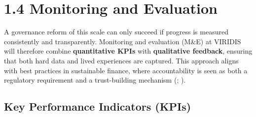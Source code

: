\documentclass[
  english,
  12pt,
  oneside,
  open=any]{scrbook}
\begin{document}
\section{1.4 Monitoring and Evaluation}\label{sec-monitoring}

A governance reform of this scale can only succeed if progress is
measured consistently and transparently. Monitoring and evaluation
(M\&E) at VIRIDIS will therefore combine \textbf{quantitative KPIs} with
\textbf{qualitative feedback}, ensuring that both hard data and lived
experiences are captured. This approach aligns with best practices in
sustainable finance, where accountability is seen as both a regulatory
requirement and a trust-building mechanism
(; ).

\subsection{Key Performance Indicators
(KPIs)}\label{key-performance-indicators-kpis}
\end{document}
